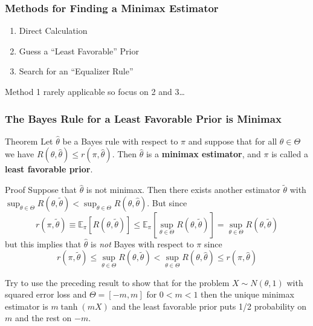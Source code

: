 \begin{frame}
  \frametitle{Methods for Finding a Minimax Estimator}

  \begin{enumerate}
    \item Direct Calculation 
    \item Guess a ``Least Favorable'' Prior
    \item Search for an ``Equalizer Rule''
  \end{enumerate}

  \vspace{2em}
  \hfill\alert{Method 1 rarely applicable so focus on 2 and 3\dots}

\end{frame}
\begin{frame}
  \frametitle{The Bayes Rule for a Least Favorable Prior is Minimax}


  \begin{block}{Theorem}
    \small
    Let $\widehat{\theta}$ be a Bayes rule with respect to $\pi$ and suppose that for all $\theta\in \Theta$ we have $R(\theta,\widehat{\theta}) \leq r(\pi, \widehat{\theta})$.
    Then $\widehat{\theta}$ is a \textbf{minimax estimator}, and $\pi$ is called a \textbf{least favorable prior}.
  \end{block}

  \begin{block}{Proof}
    \small
    Suppose that $\widehat{\theta}$ is not minimax.
    Then there exists another estimator $\widetilde{\theta}$ with $\sup_{\theta\in\Theta} R(\theta, \widetilde{\theta}) < \sup_{\theta\in \Theta} R(\theta, \widehat{\theta})$.
    But since
    \[
      r(\pi, \widetilde{\theta}) \equiv \mathbb{E}_{\pi}\left[ R(\theta,\widetilde{\theta}) \right] \leq \mathbb{E}_{\pi}\left[ \sup_{\theta \in \Theta} R(\theta, \widetilde{\theta}) \right] = \sup_{\theta \in \Theta} R(\theta, \widetilde{\theta})
    \]
    but this implies that $\widehat{\theta}$ is \emph{not} Bayes with respect to $\pi$ since 
    \[
      r(\pi, \widetilde{\theta}) \leq \sup_{\theta\in \Theta} R(\theta, \widetilde{\theta}) < \sup_{\theta \in \Theta} R(\theta, \widehat{\theta}) \leq r(\pi, \widehat{\theta})
    \]
  \end{block}
\end{frame}
\begin{frame}
  Try to use the preceding result to show that for the problem $X\sim N(\theta, 1)$ with squared error loss and $\Theta = [-m, m]$ for $0< m < 1$ then the unique minimax estimator is $m \tanh(mX)$ and the least favorable prior puts 1/2 probability on $m$ and the rest on $-m$.
\end{frame}

